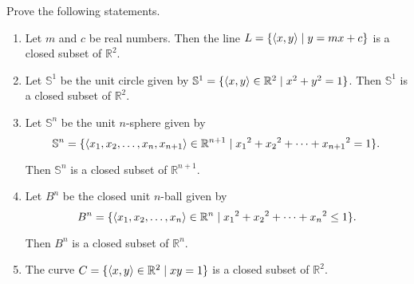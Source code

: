 \begin{exercise}
	Prove the following statements.
	\begin{enumerate}[label={(\roman*)}]
		\item Let $m$ and $c$ be real numbers. Then the line $L = \{ \left\langle{x, y}\right\rangle \mid y = mx + c \}$ is a closed subset of $\mathbb{R}^{2}$.
		\item Let $\mathbb{S}^{1}$ be the unit circle given by $\mathbb{S}^{1} = \{ \left\langle{x, y}\right\rangle\in \mathbb{R}^{2} \mid x^{2} + y^{2} = 1 \}$. Then $\mathbb{S}^{1}$ is a closed subset of $\mathbb{R}^{2}$.
		\item Let $\mathbb{S}^{n}$ be the unit $n$-sphere given by
		      \[
			      \mathbb{S}^{n} = \{ \left\langle{x_{1}, x_{2}, \ldots, x_{n}, x_{n+1}}\right\rangle\in \mathbb{R}^{n+1} \mid {x_{1}}^{2} + {x_{2}}^{2} + \cdots + {x_{n+1}}^{2} = 1 \}.
		      \]

		      Then $\mathbb{S}^{n}$ is a closed subset of $\mathbb{R}^{n+1}$.
		\item Let $B^{n}$ be the closed unit $n$-ball given by
		      \[
			      B^{n} = \{ \left\langle{x_{1}, x_{2}, \ldots, x_{n}}\right\rangle\in \mathbb{R}^{n} \mid {x_{1}}^{2} + {x_{2}}^{2} + \cdots + {x_{n}}^{2} \leq 1 \}.
		      \]

		      Then $B^{n}$ is a closed subset of $\mathbb{R}^{n}$.
		\item The curve $C = \{ \left\langle{x, y}\right\rangle\in \mathbb{R}^{2} \mid xy = 1 \}$ is a closed subset of $\mathbb{R}^{2}$.
	\end{enumerate}
\end{exercise}

